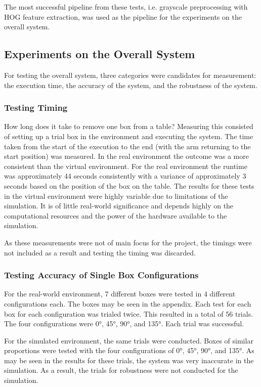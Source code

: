 \documentclass[letterpaper, 10 pt, conference]{conf/ieeeconf}  %
\begin{document}
The most successful pipeline from these tests, i.e. grayscale preprocessing with
HOG feature extraction, was used as the pipeline for the experiments on the
overall system.

\subsection{Experiments on the Overall System}
For testing the overall system, three categories were candidates for
measurement: the execution time, the accuracy of the system, and the robustness
of the system.
\subsubsection{Testing Timing}
How long does it take to remove one box from a table? Measuring this consisted
of setting up a trial box in the environment and executing the system. The time
taken from the start of the execution to the end (with the arm returning to the
start position) was measured. In the real environment the outcome was a more
consistent than the virtual environment. For the real environment the runtime
was approximately 44 seconds consistently with a variance of approximately 3
seconds based on the position of the box on the table. The results for these
tests in the virtual environment were highly variable due to limitations of the
simulation. It is of little real-world significance and depends highly on the
computational resources and the power of the hardware available to the
simulation.

As these measurements were not of main focus for the project, the timings were not
included as a result and testing the timing was discarded.

\subsubsection{Testing Accuracy of Single Box Configurations}
For the real-world environment, 7 different boxes were tested in 4 different
configurations each. The boxes may be seen in the appendix. Each test for each
box for each configuration was trialed twice. This resulted in a total of 56
trials. The four configurations were \ang{0}, \ang{45}, \ang{90}, and \ang{135}.
Each trial was successful.

For the simulated environment, the same trials were conducted. Boxes of similar
proportions were tested with the four configurations of \ang{0}, \ang{45},
\ang{90}, and \ang{135}. As may be seen in the results for these trials, the
system was very inaccurate in the simulation. As a result, the trials for
robustness were not conducted for the simulation.
\end{document}
